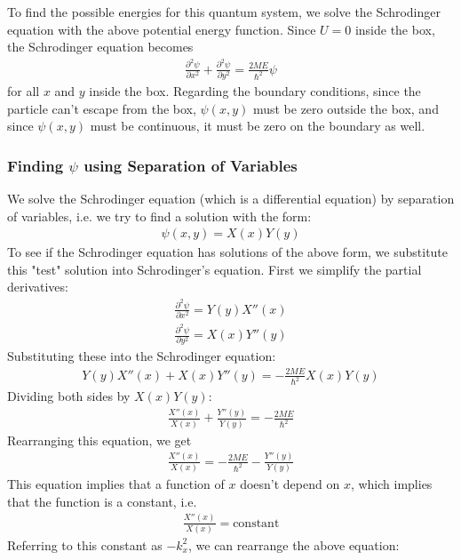 \documentclass[10pt]{article}
\begin{document}
To find the possible energies for this quantum system, we solve the Schrodinger equation with the above potential energy function. Since $U = 0$ inside the box, the Schrodinger equation becomes
\begin{align}
        \frac{\partial^2 \psi}{\partial x^2} + \frac{\partial^2 \psi}{\partial y^2}  = \frac{2ME}{\hbar^2} \psi
\end{align}
for all $x$ and $y$ inside the box. Regarding the boundary conditions, since the particle can't escape from the box, $\psi(x, y)$ must be zero outside the box, and since $\psi(x, y)$ must be continuous, it must be zero on the boundary as well.  

\subsubsection{Finding $\psi$ using Separation of Variables}
We solve the Schrodinger equation (which is a differential equation) by separation of variables, i.e. we try to find a solution with the form: 
\begin{align}
    \psi(x, y) = X(x)Y(y)
\end{align}
To see if the Schrodinger equation has solutions of the above form, we substitute this "test" solution into Schrodinger's equation. First we simplify the partial derivatives:
\begin{align}
    \frac{\partial^2 \psi}{\partial x^2} = Y(y)X''(x) \\
    \frac{\partial^2 \psi}{\partial y^2} = X(x)Y''(y)
\end{align}
Substituting these into the Schrodinger equation:
\begin{align}
    Y(y)X''(x) + X(x)Y''(y) = - \frac{2ME}{\hbar^2}X(x)Y(y)
\end{align}
Dividing both sides by $X(x)Y(y)$:
\begin{align}
    \frac{X''(x)}{X(x)} + \frac{Y''(y)}{Y(y)} = - \frac{2ME}{\hbar^2}
\end{align}
Rearranging this equation, we get
\begin{align}
    \frac{X''(x)}{X(x)} = - \frac{2ME}{\hbar^2} - \frac{Y''(y)}{Y(y)}
\end{align}
This equation implies that a function of $x$ doesn't depend on $x$, which implies that the function is a constant, i.e.
\begin{align}
    \frac{X''(x)}{X(x)} = \text{constant}
\end{align}
Referring to this constant as $-k_x^2$, we can rearrange the above equation:
\end{document}
